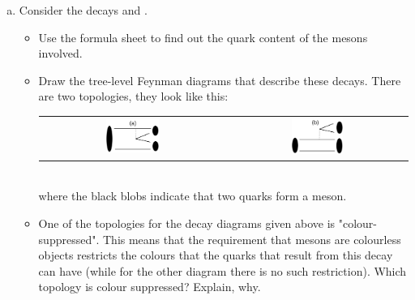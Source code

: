 \begin{enumerate}[a)]
\item Consider the decays  and . 
 \begin{itemize}
 \item Use the formula sheet to find out the quark content of the mesons involved.
 \item Draw the tree-level Feynman diagrams that describe these decays. There are two topologies, they look like this:\\
 \begin{tabular}{cc}
 \includegraphics[width=0.3\textwidth]{problemsheets/ps2figs/CSup} &
 \includegraphics[width=0.3\textwidth]{problemsheets/ps2figs/CFav}
 \end{tabular}\\
 where the black blobs indicate that two quarks form a meson.
 \item One of the topologies for the  decay diagrams given above is "colour-suppressed". This means that the requirement that mesons are colourless objects restricts the colours that the quarks that result from this decay can have (while for the other diagram there is no such restriction). Which topology is colour suppressed? Explain, why.

\end{itemize}
\end{enumerate}
